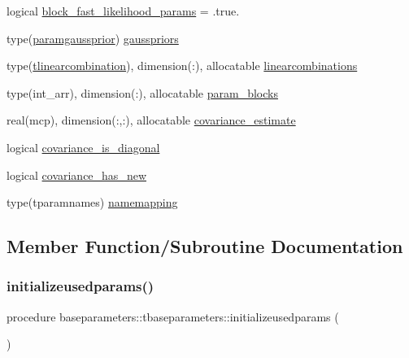 \begin{DoxyCompactItemize}
\item 
logical \mbox{\hyperlink{structbaseparameters_1_1tbaseparameters_a0c9c386d0aa35b69fd30a185219b3840}{block\+\_\+fast\+\_\+likelihood\+\_\+params}} = .true.
\item 
type(\mbox{\hyperlink{structbaseparameters_1_1paramgaussprior}{paramgaussprior}}) \mbox{\hyperlink{structbaseparameters_1_1tbaseparameters_a6039cd0a2eeaf706dd7eabb87bce3133}{gausspriors}}
\item 
type(\mbox{\hyperlink{structbaseparameters_1_1tlinearcombination}{tlinearcombination}}), dimension(\+:), allocatable \mbox{\hyperlink{structbaseparameters_1_1tbaseparameters_a785d299554c439728b005ef55d49ec91}{linearcombinations}}
\item 
type(int\+\_\+arr), dimension(\+:), allocatable \mbox{\hyperlink{structbaseparameters_1_1tbaseparameters_a7491e16e8171d06591833c239c4a4cd9}{param\+\_\+blocks}}
\item 
real(mcp), dimension(\+:,\+:), allocatable \mbox{\hyperlink{structbaseparameters_1_1tbaseparameters_a7316c5929ddb13a72a69ae5f9a65e17e}{covariance\+\_\+estimate}}
\item 
logical \mbox{\hyperlink{structbaseparameters_1_1tbaseparameters_afd3f88f27524e3c98763296792f3f811}{covariance\+\_\+is\+\_\+diagonal}}
\item 
logical \mbox{\hyperlink{structbaseparameters_1_1tbaseparameters_a2fd504075c8cd30d6158dc303ecf54c9}{covariance\+\_\+has\+\_\+new}}
\item 
type(tparamnames) \mbox{\hyperlink{structbaseparameters_1_1tbaseparameters_ac70780d0409c47f2a0bb6d8d31ec39e1}{namemapping}}
\end{DoxyCompactItemize}


\subsection{Member Function/\+Subroutine Documentation}
\mbox{\label{structbaseparameters_1_1tbaseparameters_a500c52b94b8ede52110e99c6e9209869}} 
\subsubsection{\texorpdfstring{initializeusedparams()}{initializeusedparams()}}
{\footnotesize\ttfamily procedure baseparameters\+::tbaseparameters\+::initializeusedparams (\begin{DoxyParamCaption}{ }\end{DoxyParamCaption})\hspace{0.3cm}{\ttfamily [private]}}

